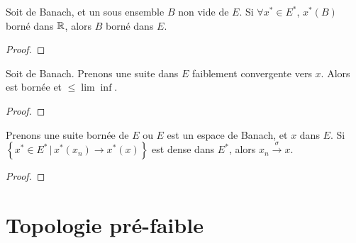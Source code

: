 \begin{proposition}
	Soit  de Banach, et un sous ensemble $B$ non
	vide de $E$.
	Si $\forall x^{*} \in E^{*}$, $x^{*}(B)$ borné dans $\mathbb{R}$, alors $B$ borné
	dans $E$.
\end{proposition}

\begin{proof}
	
\end{proof}

\begin{corollary}
	Soit  de Banach.
	Prenons une suite  dans $E$ faiblement
	convergente vers $x$.
	Alors  est bornée et  $\leq
	\lim\inf$.
\end{corollary}

\begin{proof}
	
\end{proof}

\begin{proposition}
	Prenons une suite bornée de $E$ ou $E$ est un espace de Banach, et $x$ dans
	$E$.
	Si $\left\{ x^{*} \in E^{*} \, | \, x^{*}(x_{n}) \rightarrow x^{*}(x)
\right\}$ est dense dans $E^{*}$, alors $x_{n} \xrightarrow{\sigma} x$.
\end{proposition}

\begin{proof}
	
\end{proof}

\section{Topologie pré-faible}
